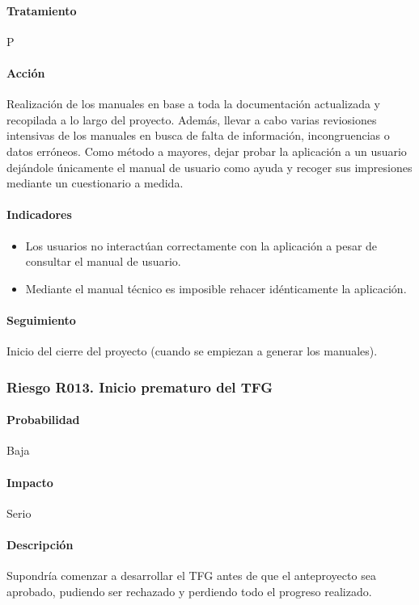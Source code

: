 \documentclass[10pt,a4paper]{article}
\begin{document}
				\paragraph{Tratamiento} P
				\paragraph{Acción} Realización de los manuales en base a toda la documentación actualizada y recopilada a lo largo del proyecto. Además, llevar a cabo varias reviosiones intensivas de los manuales en busca de falta de información, incongruencias o datos erróneos. Como método a mayores, dejar probar la aplicación a un usuario dejándole únicamente el manual de usuario como ayuda y recoger sus impresiones mediante un cuestionario a medida.
				\paragraph{Indicadores} 
				\begin{itemize}
				    \item Los usuarios no interactúan correctamente con la aplicación a pesar de consultar el manual de usuario.
				    \item Mediante el manual técnico es imposible rehacer idénticamente la aplicación.
				\end{itemize}				 
				\paragraph{Seguimiento}	Inicio del cierre del proyecto (cuando se empiezan a generar los manuales).
				
				\subsubsection{Riesgo R013. Inicio prematuro del TFG}
				\paragraph{Probabilidad} Baja
				\paragraph{Impacto}	Serio
				\paragraph{Descripción} Supondría comenzar a desarrollar el TFG antes de que el anteproyecto sea aprobado, pudiendo ser rechazado y perdiendo todo el progreso realizado.
\end{document}
